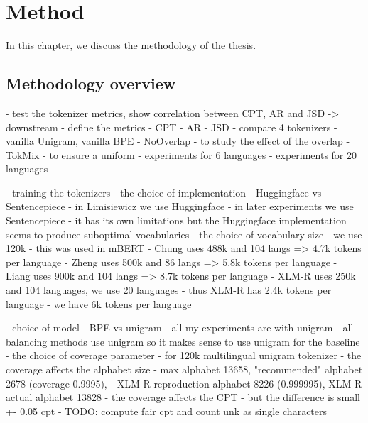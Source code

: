 

\chapter{Method}
\label{chap:method}


In this chapter, we discuss the methodology of the thesis. 

\section{Methodology overview}


- test the tokenizer metrics, show correlation between CPT, AR and JSD -> downstream
    - define the metrics
        - CPT
        - AR
        - JSD
    - compare 4 tokenizers
        - vanilla Unigram, vanilla BPE
        - NoOverlap - to study the effect of the overlap
        - TokMix - to ensure a uniform 
    - experiments for 6 languages
    - experiments for 20 languages

- training the tokenizers
    - the choice of implementation
        - Huggingface vs Sentencepiece
            - in Limisiewicz we use Huggingface
            - in later experiments we use Sentencepiece
                - it has its own limitations but the Huggingface implementation seems to produce suboptimal vocabularies
    - the choice of vocabulary size
        - we use 120k
        - this was used in mBERT
        - Chung uses 488k and 104 langs => 4.7k tokens per language
        - Zheng uses 500k and 86 langs => 5.8k tokens per language
        - Liang uses 900k and 104 langs => 8.7k tokens per language
        - XLM-R uses 250k and 104 languages, we use 20 languages
            - thus XLM-R has 2.4k tokens per language
            - we have 6k tokens per language

    - choice of model - BPE vs unigram
        - all my experiments are with unigram
        - all balancing methods use unigram so it makes sense to use unigram for the baseline
    - the choice of coverage parameter
        - for 120k multilingual unigram tokenizer
            - the coverage affects the alphabet size 
                - max alphabet 13658, "recommended" alphabet 2678 (coverage 0.9995), 
                - XLM-R reproduction alphabet 8226 (0.999995), XLM-R actual alphabet 13828
            - the coverage affects the CPT
                - but the difference is small +- 0.05 cpt
                - TODO: compute fair cpt and count unk as single characters



